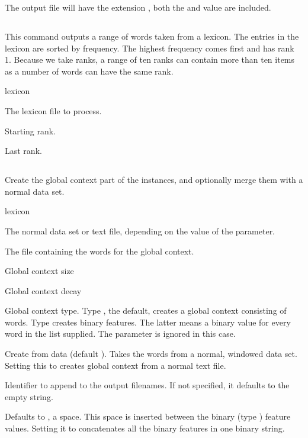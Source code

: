 \documentclass[a4paper,10pt,twoside]{report}
\begin{document}
The output file will have the extension , both the
 and  value are included.

\subsection{}

This command outputs a range of words taken from a lexicon. The
entries in the lexicon are sorted by frequency. The highest frequency
comes first and has rank 1.  Because we take ranks, a range of ten
ranks can contain more than ten items as a number of words can have
the same rank.

\begin{varlist}{lexicon}
\item[lexicon] The lexicon file to process.
\item[n] Starting rank.
\item[m] Last rank.
\end{varlist}

\subsection{}

Create the global context part of the instances, and optionally merge
them with a normal data set.

\begin{varlist}{lexicon}
\item[filename] The normal data set or text file, depending on the
  value of the  parameter.
\item[range] The file containing the words for the global context.
\item[gcs] Global context size
\item[gcd] Global context decay
\item[gct] Global context type. Type , the default, creates a
  global context consisting of words. Type  creates binary
  features. The latter means a binary value for every word in the
   list supplied. The  parameter is ignored in
  this case.
\item[fd] Create from data (default ). Takes the words from a
  normal, windowed data set. Setting this to  creates global
  context from a normal text file.
\item[id] Identifier to append to the output filenames. If not
  specified, it defaults to the empty string.
\item[gc\_sep] Defaults to , a space. This space is inserted
  between the binary (type ) feature values. Setting it to
   concatenates all the binary features in one binary string.
\end{varlist}
\end{document}
